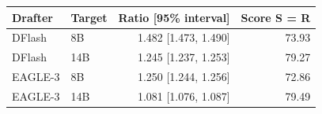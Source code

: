 \begin{tabular}{llrr}
\toprule
Drafter & Target & Ratio [95\% interval] & Score S = R \\
\midrule
DFlash & 8B & 1.482 [1.473, 1.490] & 73.93 \\
DFlash & 14B & 1.245 [1.237, 1.253] & 79.27 \\
EAGLE-3 & 8B & 1.250 [1.244, 1.256] & 72.86 \\
EAGLE-3 & 14B & 1.081 [1.076, 1.087] & 79.49 \\
\bottomrule
\end{tabular}
